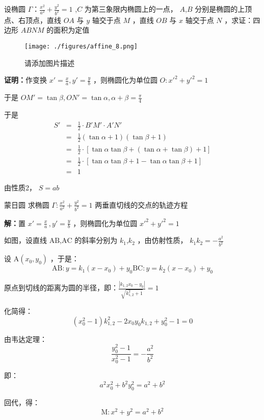 \begin{corollary}{}
设椭圆 \(\Gamma：\frac{x^2}{a^2}+\frac{y^2}{b^2}=1\) ,\(C\) 为第三象限内椭圆上的一点， \(A\),\(B\) 分别是椭圆的上顶点、右顶点，直线 \(OA\) 与 \(y\) 轴交于点 \(M\) ，直线 \(OB\) 与 \(x\) 轴交于点 \(N\) ，求证：四边形 \(ABNM\) 的面积为定值\begin{figure}[ht]
\centering
\texttt{[image: ./figures/affine\_8.png]}
\caption{请添加图片描述} \label{affine_fig8}
\end{figure}

\textbf{证明：}作变换 \(x'=\frac{x}{a},y'=\frac{y}{b}\) ，则椭圆化为单位圆 \(O:x'^2+y'^2=1\)

于是 \(OM'=\tan{\beta},ON'=\tan{\alpha},\alpha+\beta=\frac{\pi}{4}\) 

于是
$$\begin{eqnarray} S'&=&\frac{1}{2}\cdot B'M'\cdot A'N'\\ &=&\frac{1}{2}(\tan\alpha+1)(\tan\beta+1)\\ &=&\frac{1}{2}\cdot\left[\tan\alpha\tan\beta+(\tan\alpha+\tan\beta)+1\right]\\ &=&\frac{1}{2}\cdot[\tan\alpha\tan\beta+1-\tan\alpha\tan\beta+1]\\ &=&1 \end{eqnarray}$$

由性质2， \(S=ab\) 
\end{corollary}
\begin{corollary}{蒙日圆}
求椭圆 \(\Gamma:\frac{x^2}{a^2}+\frac{y^2}{b^2}=1\) 两垂直切线的交点的轨迹方程

\textbf{解：}置 \(x'=\frac{x}{a}\,,y'=\frac{y}b\) ，则椭圆化为单位圆 \(x'^2+y'^2=1\) 

如图，设直线 \(\text{AB}\),\(\text{AC}\) 的斜率分别为 \(k_1\),\(k_2\) ，由仿射性质， \(k_1k_2=-\frac{a^2}{b^2}\) 

设 \(\text{A}(x_0,y_0)\) ，于是： 
$$\text{AB}:y=k_1(x-x_0)+y_0\text{BC}:y=k_2(x-x_0)+y_0 $$

原点到切线的距离为圆的半径，即：\(\frac{|k_{1,2}x_0-y_0|}{\sqrt{k_{1,2}^2+1}}=1\)

化简得：
$$(x_0^2-1)k_{1,2}^2-2x_0y_0k_{1,2}+y_0^2-1=0$$

由韦达定理：
$$\frac{y_0^2-1}{x_0^2-1}=-\frac{a^2}{b^2}$$

即：
$$a^2x_0^2+b^2y_0^2=a^2+b^2$$

回代，得：
$$\text{M}:x^2+y^2=a^2+b^2$$
\end{corollary}
